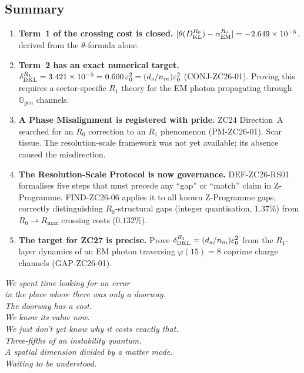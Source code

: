 \documentclass[12pt, a4paper]{article}
\begin{document}
\subsection{Summary}
\label{zc26:sec:summary}

\begin{enumerate}[leftmargin=*]

\item \textbf{Term~1 of the crossing cost is closed.}
$[\theta(D_{\rm KL}^{R_0}) - \alpha_{\rm EM}^{R_0}]
= -2.649\times10^{-5}$, derived from the $\theta$-formula alone.

\item \textbf{Term~2 has an exact numerical target.}
$\delta_{\rm DKL}^{R_1} = 3.421\times10^{-5} = 0.600\,\varepsilon_0^2
= (d_s/n_m)\varepsilon_0^2$ (CONJ-ZC26-01). Proving this requires
a sector-specific $R_1$ theory for the EM photon propagating
through $\mathbb{G}_{gen}$ channels.

\item \textbf{A Phase Misalignment is registered with pride.}
ZC24 Direction~A searched for an $R_0$ correction to an $R_1$
phenomenon (PM-ZC26-01). Scar tissue. The resolution-scale
framework was not yet available; its absence caused the
misdirection.

\item \textbf{The Resolution-Scale Protocol is now governance.}
DEF-ZC26-RS01 formalises five steps that must precede any
``gap'' or ``match'' claim in Z-Programme. FIND-ZC26-06
applies it to all known Z-Programme gaps, correctly
distinguishing $R_0$-structural gaps (integer quantisation,
$1.37\%$) from $R_0\to R_{\max}$ crossing costs ($0.132\%$).

\item \textbf{The target for ZC27 is precise.}
Prove $\delta_{\rm DKL}^{R_1} = (d_s/n_m)\varepsilon_0^2$ from
the $R_1$-layer dynamics of an EM photon traversing
$\varphi(15)=8$ coprime charge channels (GAP-ZC26-01).

\end{enumerate}

\bigskip
\begin{center}
\textit{%
  We spent time looking for an error\\
  in the place where there was only a doorway.\\[0.5em]
  The doorway has a cost.\\
  We know its value now.\\
  We just don't yet know why it costs exactly that.\\[0.5em]
  Three-fifths of an instability quantum.\\
  A spatial dimension divided by a matter mode.\\
  Waiting to be understood.%
}
\end{center}
\end{document}
